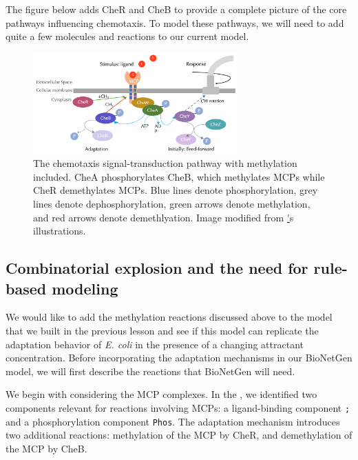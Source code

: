 The figure below adds CheR and CheB to provide a complete picture of the core pathways influencing chemotaxis. To model these pathways, we will need to add quite a few molecules and reactions to our current model.

\begin{figure}[h]
\centering
\mySfFamily
\includegraphics[width = 0.7\textwidth]{../images/chemotaxis_wholestory.png}
\caption{The chemotaxis signal-transduction pathway with methylation included. CheA phosphorylates CheB, which methylates MCPs while CheR demethylates MCPs. Blue lines denote phosphorylation, grey lines denote dephosphorylation, green arrows denote methylation, and red arrows denote demethlyation. Image modified from \href{http://chemotaxis.biology.utah.edu/Parkinson_Lab/projects/ecolichemotaxis/ecolichemotaxis.html}'s illustrations.}
\label{fig:chemotaxis_wholestory}
\end{figure}


\FloatBarrier
{}
\subsection{Combinatorial explosion and the need for rule-based modeling}

We would like to add the methylation reactions discussed above to the model that we built in the previous lesson and see if this model can replicate the adaptation behavior of \textit{E. coli} in the presence of a changing attractant concentration. Before incorporating the adaptation mechanisms in our BioNetGen model, we will first describe the reactions that BioNetGen will need.

We begin with considering the MCP complexes. In the , we identified two components relevant for reactions involving MCPs: a ligand-binding component \texttt{;} and a phosphorylation component \texttt{Phos}. The adaptation mechanism introduces two additional reactions: methylation of the MCP by CheR, and demethylation of the MCP by CheB.

